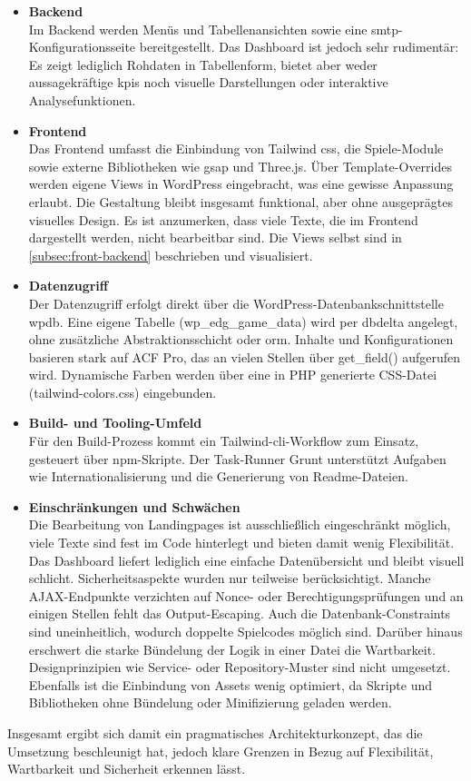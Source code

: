 \begin{itemize}
    \item \textbf{Backend}\\
    Im Backend werden Menüs und Tabellenansichten sowie eine \gls{smtp}-Konfigurationsseite bereitgestellt.
    Das Dashboard ist jedoch sehr rudimentär: Es zeigt lediglich Rohdaten in Tabellenform, bietet aber weder aussagekräftige \gls{kpi}s noch visuelle Darstellungen oder interaktive Analysefunktionen.

    \item \textbf{Frontend}\\
    Das Frontend umfasst die Einbindung von Tailwind \gls{css}, die Spiele-Module sowie externe Bibliotheken wie \gls{gsap} und Three.js.
    Über Template-Overrides werden eigene Views in WordPress eingebracht, was eine gewisse Anpassung erlaubt.
    Die Gestaltung bleibt insgesamt funktional, aber ohne ausgeprägtes visuelles Design.
    Es ist anzumerken, dass viele Texte, die im Frontend dargestellt werden, nicht bearbeitbar sind.
    Die Views selbst sind in \ref{subsec:front-backend} beschrieben und visualisiert.

    \item \textbf{Datenzugriff}\\
    Der Datenzugriff erfolgt direkt über die WordPress-Datenbankschnittstelle \gls{wpdb}.
    Eine eigene Tabelle (wp\_edg\_game\_data) wird per \gls{dbdelta} angelegt, ohne zusätzliche Abstraktionsschicht oder \gls{orm}.
    Inhalte und Konfigurationen basieren stark auf ACF Pro, das an vielen Stellen über get\_field() aufgerufen wird.
    Dynamische Farben werden über eine in PHP generierte CSS-Datei (tailwind-colors.css) eingebunden.

    \item \textbf{Build- und Tooling-Umfeld}\\
    Für den Build-Prozess kommt ein Tailwind-\gls{cli}-Workflow zum Einsatz, gesteuert über npm-Skripte.
    Der Task-Runner Grunt unterstützt Aufgaben wie Internationalisierung und die Generierung von Readme-Dateien.

    \item \textbf{Einschränkungen und Schwächen}\\
    Die Bearbeitung von Landingpages ist ausschließlich eingeschränkt möglich, viele Texte sind fest im Code hinterlegt und bieten damit wenig Flexibilität.
    Das Dashboard liefert lediglich eine einfache Datenübersicht und bleibt visuell schlicht.
    Sicherheitsaspekte wurden nur teilweise berücksichtigt.
    Manche AJAX-Endpunkte verzichten auf Nonce- oder Berechtigungsprüfungen und an einigen Stellen fehlt das Output-Escaping.
    Auch die Datenbank-Constraints sind uneinheitlich, wodurch doppelte Spielcodes möglich sind.
    Darüber hinaus erschwert die starke Bündelung der Logik in einer Datei die Wartbarkeit.
    Designprinzipien wie Service- oder Repository-Muster sind nicht umgesetzt.
    Ebenfalls ist die Einbindung von Assets wenig optimiert, da Skripte und Bibliotheken ohne Bündelung oder Minifizierung geladen werden.
\end{itemize}
\vspace{0.5em}
Insgesamt ergibt sich damit ein pragmatisches Architekturkonzept, das die Umsetzung beschleunigt hat, jedoch klare Grenzen in Bezug auf Flexibilität, Wartbarkeit und Sicherheit erkennen lässt.
